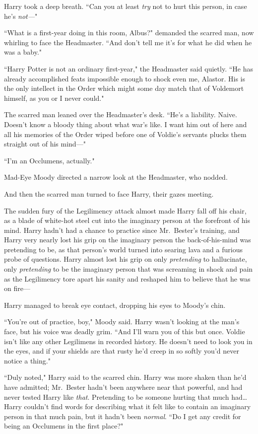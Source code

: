 Harry took a deep breath. ``Can you at least \emph{try} not to hurt this person, in case he's \emph{not—}"

``What is a first-year doing in this room, Albus?" demanded the scarred man, now whirling to face the Headmaster. ``And don't tell me it's for what he did when he was a baby."

``Harry Potter is not an ordinary first-year," the Headmaster said quietly. ``He has already accomplished feats impossible enough to shock even me, Alastor. His is the only intellect in the Order which might some day match that of Voldemort himself, as you or I never could."

The scarred man leaned over the Headmaster's desk. ``He's a liability. Naive. Doesn't know a bloody thing about what war's like. I want him out of here and all his memories of the Order wiped before one of Voldie's servants plucks them straight out of his mind—"

``I'm an Occlumens, actually."

Mad-Eye Moody directed a narrow look at the Headmaster, who nodded.

And then the scarred man turned to face Harry, their gazes meeting.

The sudden fury of the Legilimency attack almost made Harry fall off his chair, as a blade of white-hot steel cut into the imaginary person at the forefront of his mind. Harry hadn't had a chance to practice since Mr.~Bester's training, and Harry very nearly lost his grip on the imaginary person the back-of-his-mind was pretending to be, as that person's world turned into searing lava and a furious probe of questions. Harry almost lost his grip on only \emph{pretending} to hallucinate, only \emph{pretending} to be the imaginary person that was screaming in shock and pain as the Legilimency tore apart his sanity and reshaped him to believe that he was on fire—

Harry managed to break eye contact, dropping his eyes to Moody's chin.

``You're out of practice, boy," Moody said. Harry wasn't looking at the man's face, but his voice was deadly grim. ``And I'll warn you of this but once. Voldie isn't like any other Legilimens in recorded history. He doesn't need to look you in the eyes, and if your shields are that rusty he'd creep in so softly you'd never notice a thing."

``Duly noted," Harry said to the scarred chin. Harry was more shaken than he'd have admitted; Mr.~Bester hadn't been anywhere near that powerful, and had never tested Harry like \emph{that}. Pretending to be someone hurting that much had{\ldots} Harry couldn't find words for describing what it felt like to contain an imaginary person in that much pain, but it hadn't been \emph{normal}. ``Do I get any credit for being an Occlumens in the first place?"

